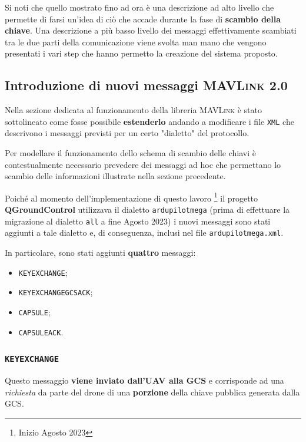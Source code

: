 \documentclass[a4paper, 12pt, oneside]{article}
\theoremstyle{definition}
\begin{document}
Si noti che quello mostrato fino ad ora è una descrizione ad alto livello che permette di farsi un'idea di ciò che accade durante la fase di \textbf{scambio della chiave}. Una descrizione a più basso livello dei messaggi effettivamente scambiati tra le due parti della comunicazione viene svolta man mano che vengono presentati i vari step che hanno permetto la creazione del sistema proposto.

\newpage

\subsection{Introduzione di nuovi messaggi \textsc{MAVLink} 2.0}
Nella sezione dedicata al funzionamento della libreria \textsc{MAVLink} è stato sottolineato come fosse possibile \textbf{estenderlo} andando a modificare i file \texttt{XML} che descrivono i messaggi previsti per un certo "dialetto" del protocollo.

Per modellare il funzionamento dello schema di scambio delle chiavi è contestualmente necessario prevedere dei messaggi ad hoc che permettano lo scambio delle informazioni illustrate nella sezione precedente.

Poiché al momento dell'implementazione di questo lavoro \footnote{Inizio Agosto 2023} il progetto \textbf{QGroundControl} utilizzava il dialetto \texttt{ardupilotmega} (prima di effettuare la migrazione al dialetto \texttt{all} a fine Agosto 2023) i nuovi messaggi sono stati aggiunti a tale dialetto e, di conseguenza, inclusi nel file \texttt{ardupilotmega.xml}.

In particolare, sono stati aggiunti \textbf{quattro} messaggi:

\begin{itemize}
    \item \texttt{KEYEXCHANGE};
    \item \texttt{KEYEXCHANGEGCSACK};
    \item \texttt{CAPSULE};
    \item \texttt{CAPSULEACK}.
\end{itemize}

\subsubsection{\texttt{KEYEXCHANGE}}
Questo messaggio \textbf{viene inviato dall'UAV alla GCS} e corrisponde ad una \textit{richiesta} da parte del drone di una \textbf{porzione} della chiave pubblica generata dalla GCS.
\end{document}
